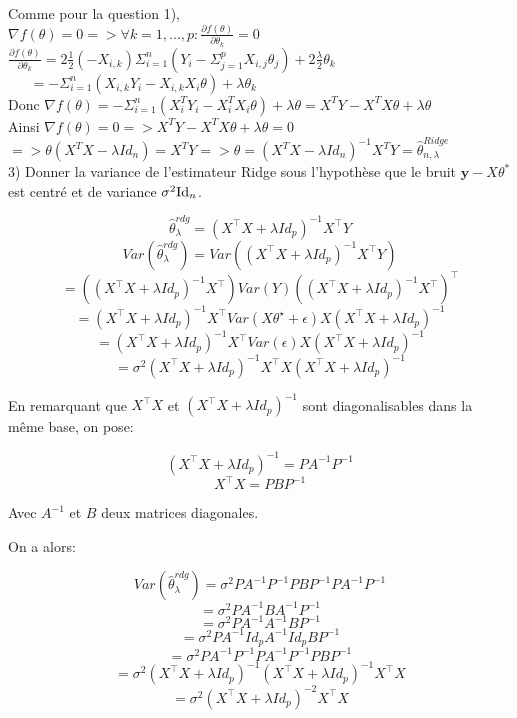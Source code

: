 Comme pour la question 1), \\
$\nabla f(\theta) = 0 => \forall k=1,...,p: \frac{\partial f(\theta)}{\partial \theta_k}=0$ \\

$\frac{\partial f(\theta)}{\partial \theta_k}=2\frac{1}{2} (-X_{i,k}) \Sigma_{i=1}^n (Y_i-\Sigma_{j=1}^pX_{i,j}\theta_j)+2\frac{\lambda}{2} \theta_k$ \\

$~~~~~~~=-\Sigma_{i=1}^n(X_{i,k}Y_i-X_{i,k}X_i\theta)+\lambda \theta_k$ \\

Donc $\nabla f(\theta)=-\Sigma_{i=1}^n(X_i^TY_i-X_i^TX_i\theta)+\lambda \theta=X^TY-X^TX\theta + \lambda \theta$ \\

Ainsi $\nabla f(\theta)=0 => X^TY-X^TX\theta + \lambda \theta=0$ \\
$=> \theta(X^TX - \lambda Id_n) = X^TY => \theta = (X^TX - \lambda Id_n)^{-1} X^TY = \hat{\theta}_{n,\lambda}^{Ridge} $ \\

3) Donner la variance de l'estimateur Ridge sous l’hypothèse que le bruit $\mathbf{y} -X \theta^*$ est centré et de variance $\sigma^2 {\rm Id}_n$.

$$\hat \theta_{\lambda}^{rdg} = (X^\top X+\lambda Id_p)^{-1}X^\top Y$$
$$Var(\hat \theta_{\lambda}^{rdg}) = Var((X^\top X+\lambda Id_p)^{-1}X^\top Y)$$ 
$$ = ((X^\top X+\lambda Id_p)^{-1}X^\top) Var(Y) ((X^\top X+\lambda Id_p)^{-1}X^\top)^\top$$ 
$$ = (X^\top X+\lambda Id_p)^{-1}X^\top Var(X \theta^\star + \epsilon)X(X^\top X+\lambda Id_p)^{-1}$$ 
$$ = (X^\top X+\lambda Id_p)^{-1}X^\top Var(\epsilon)X(X^\top X+\lambda Id_p)^{-1}$$ 
$$ = \sigma^2 (X^\top X+\lambda Id_p)^{-1}X^\top X(X^\top X+\lambda Id_p)^{-1}$$ 

En remarquant que $X^\top X$ et $(X^\top X+\lambda Id_p)^{-1}$ sont diagonalisables dans la même base, on pose:

$$(X^\top X+\lambda Id_p)^{-1} = PA^{-1}P^{-1}$$
$$X^\top X = PBP^{-1}$$

Avec $A^{-1}$ et $B$ deux matrices diagonales.

On a alors:

$$Var(\hat \theta_{\lambda}^{rdg}) = \sigma^2PA^{-1}P^{-1}PBP^{-1}PA^{-1}P^{-1}$$
$$ = \sigma^2PA^{-1}BA^{-1}P^{-1}$$
$$ = \sigma^2PA^{-1}A^{-1}BP^{-1}$$
$$ = \sigma^2PA^{-1}Id_pA^{-1}Id_pBP^{-1}$$
$$ = \sigma^2PA^{-1}P^{-1}PA^{-1}P^{-1}PBP^{-1}$$
$$ = \sigma^2 (X^\top X+\lambda Id_p)^{-1} (X^\top X+\lambda Id_p)^{-1}X^\top X$$
$$ = \sigma^2 (X^\top X+\lambda Id_p)^{-2} X^\top X$$






